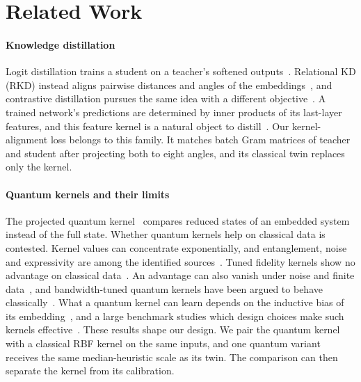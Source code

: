 \section{Related Work}
\label{sec:related}

\paragraph{Knowledge distillation}
Logit distillation trains a student on a teacher's softened outputs~\citep{hinton2015distilling}.
Relational KD (RKD) instead aligns pairwise distances and angles of the embeddings~\citep{park2019relational}, and contrastive distillation pursues the same idea with a different objective~\citep{tian2020contrastive}.
A trained network's predictions are determined by inner products of its last-layer features, and this feature kernel is a natural object to distill~\citep{he2022feature}.
Our kernel-alignment loss belongs to this family. It matches batch Gram matrices of teacher and student after projecting both to eight angles, and its classical twin replaces only the kernel.

\paragraph{Quantum kernels and their limits}
The projected quantum kernel~\citep{huang2021power} compares reduced states of an embedded system instead of the full state.
Whether quantum kernels help on classical data is contested.
Kernel values can concentrate exponentially, and entanglement, noise and expressivity are among the identified sources~\citep{thanasilp2024exponential}.
Tuned fidelity kernels show no advantage on classical data~\citep{slattery2023numerical}. An advantage can also vanish under noise and finite data~\citep{wang2021towards}, and bandwidth-tuned quantum kernels have been argued to behave classically~\citep{florezablan2025similarity}.
What a quantum kernel can learn depends on the inductive bias of its embedding~\citep{kubler2021inductive}, and a large benchmark studies which design choices make such kernels effective~\citep{schnabel2025scrutiny}.
These results shape our design. We pair the quantum kernel with a classical RBF kernel on the same inputs, and one quantum variant receives the same median-heuristic scale as its twin. The comparison can then separate the kernel from its calibration.

